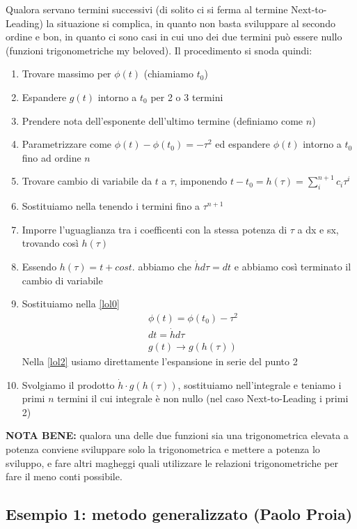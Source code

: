 Qualora servano termini successivi (di solito ci si ferma al termine Next-to-Leading) la situazione si complica, in quanto non basta sviluppare al secondo ordine e bon, in quanto ci sono casi in cui uno dei due termini può essere nullo (funzioni trigonometriche my beloved). Il procedimento si snoda quindi:
\begin{enumerate}
	\item Trovare massimo per \(\phi(t)\) (chiamiamo \(t_0\))
	\item Espandere \(g(t)\) intorno a \(t_0\) per 2 o 3 termini
	\item Prendere nota dell'esponente dell'ultimo termine (definiamo come  \(n\)) 
	\item Parametrizzare come $\phi(t) - \phi(t_0)=-\tau^2 \label{lol1}$
	ed espandere \(\phi(t)\) intorno a $t_0$ fino ad ordine \(n\)
	\item Trovare cambio di variabile da \(t\) a \(\tau\), imponendo $t - t_0 = h(\tau) = \sum_i^{n+1} c_i \tau^i$
	\item Sostituiamo nella  tenendo i termini fino a \(\tau^{n+1}\)
	\item Imporre l'uguaglianza tra i coefficenti con la stessa potenza di \(\tau\) a dx e sx, trovando così \(h(\tau)\)
	\item Essendo \(h(\tau) = t + cost. \) abbiamo che \(\dot{h}d\tau = dt\) e abbiamo così terminato il cambio di variabile
	\item Sostituiamo nella \ref{lol0}
	\begin{align}
		&\phi(t) = \phi(t_0) - \tau^2\\
		&dt=\dot{h}d\tau\\
		&g(t) \to g(h(\tau)) \label{lol2}
	\end{align}
	Nella \ref{lol2} usiamo direttamente l'espansione in serie del punto 2
	\item Svolgiamo il prodotto \(\dot{h} \cdot g(h(\tau))\), sostituiamo nell'integrale e teniamo i primi $n$ termini il cui integrale è non nullo (nel caso Next-to-Leading i primi 2)
\end{enumerate}

\textbf{NOTA BENE:} qualora una delle due funzioni sia una trigonometrica elevata a potenza conviene sviluppare solo la trigonometrica e mettere a potenza lo sviluppo, e fare altri magheggi
quali utilizzare le relazioni trigonometriche per fare il meno conti possibile.

\subsection{Esempio 1: metodo generalizzato (Paolo Proia)}

